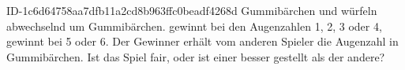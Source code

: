 \begin{exercise}
      {ID-1c6d64758aa7dfb11a2cd8b963ffc0beadf4268d}
      {Gummibärchen}
  \ifproblem\problem
    \xya{} und \xxb{} würfeln abwechselnd um Gummibärchen. \xya{} gewinnt bei den
    Augenzahlen 1, 2, 3 oder 4, \xxb{} gewinnt bei 5 oder 6. Der Gewinner
    erhält vom anderen Spieler die Augenzahl in Gummibärchen. Ist das Spiel
    fair, oder ist einer besser gestellt als der andere?
  \fi
\end{exercise}
